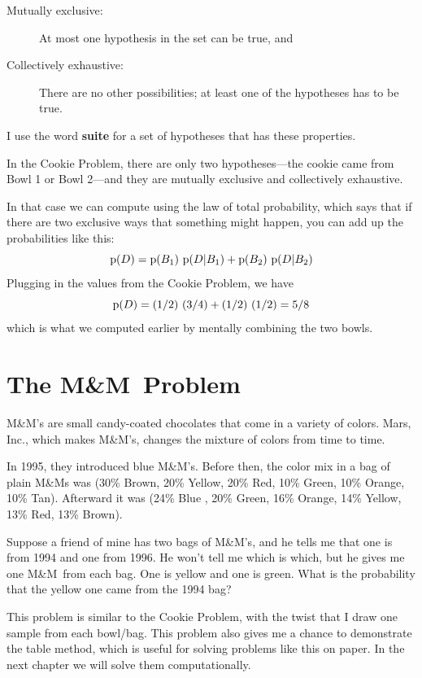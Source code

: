 \documentclass[12pt]{book}
\begin{document}
\begin{description}

\item[Mutually exclusive:] At most one hypothesis in
the set can be true, and

\item[Collectively exhaustive:] There are no other
possibilities; at least one of the hypotheses has to be true.

\end{description}

I use the word {\bf suite} for a set of hypotheses that has these
properties.

In the Cookie Problem, there are only two hypotheses---the cookie
came from Bowl 1 or Bowl 2---and they are mutually exclusive and
collectively exhaustive.

In that case we can compute  using the law of total probability,
which says that if there are two exclusive ways that something
might happen, you can add up the probabilities like this:
%
\[ \mathrm{p}(D) = \mathrm{p}(B_1)~\mathrm{p}(D|B_1) + \mathrm{p}(B_2)~\mathrm{p}(D|B_2) \]
%
Plugging in the values from the Cookie Problem, we have
%
\[ \mathrm{p}(D) = (1/2)~(3/4) + (1/2)~(1/2) = 5/8 \]
%
which is what we computed earlier by mentally combining the two
bowls.


\newcommand{\MM}{M\&M}

\section{The \MM~Problem}

\MM's are small candy-coated chocolates that come in a variety of
colors.  Mars, Inc., which makes \MM's, changes the mixture of
colors from time to time.

In 1995, they introduced blue \MM's.  Before then, the color mix in
a bag of plain M\&Ms was (30\% Brown, 20\% Yellow, 20\% Red, 10\%
Green, 10\% Orange, 10\% Tan).  Afterward it was (24\% Blue , 20\%
Green, 16\% Orange, 14\% Yellow, 13\% Red, 13\% Brown).

Suppose a friend of mine has two bags of \MM's, and he tells me
that one is from 1994 and one from 1996.  He won't tell me which is
which, but he gives me one \MM~from each bag.  One is yellow and
one is green.  What is the probability that the yellow one came
from the 1994 bag?

This problem is similar to the Cookie Problem, with the twist that I
draw one sample from each bowl/bag.  This problem also gives me a
chance to demonstrate the table method, which is useful for solving
problems like this on paper.  In the next chapter we will
solve them computationally.
\end{document}
